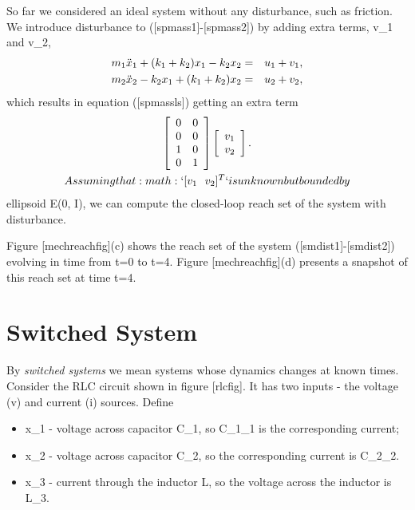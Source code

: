 \documentclass[letterpaper,10pt,english]{sphinxmanual}
\begin{document}
So far we considered an ideal system without any disturbance, such as
friction. We introduce disturbance to ({[}spmass1{]}-{[}spmass2{]}) by adding
extra terms, v_1 and v_2,
\begin{gather}
\begin{split}\begin{aligned}
m_1\ddot{x}_1+(k_1+k_2)x_1-k_2x_2 & = & u_1 + v_1, \label{smdist1}\\
m_2\ddot{x}_2-k_2x_1+(k_1+k_2)x_2 & = & u_2 + v_2, \label{smdist2}\end{aligned}\end{split}\notag
\end{gather}
which results in equation ({[}spmassls{]}) getting an extra term
\begin{gather}
\begin{split}  \left[\begin{array}{cc}
  0 & 0\\
  0 & 0\\
  1 & 0\\
  0 & 1\end{array}\right]\left[\begin{array}{c}
  v_1\\
  v_2\end{array}\right].\end{split}\notag\\\begin{split}Assuming that :math:`[v_1 ~~ v_2]^T` is unknown but bounded by\end{split}\notag
\end{gather}
ellipsoid {\mathcal E}(0, I), we can compute the
closed-loop reach set of the system with disturbance.

Figure {[}mechreachfig{]}(c) shows the reach set of the system
({[}smdist1{]}-{[}smdist2{]}) evolving in time from t=0 to t=4.
Figure {[}mechreachfig{]}(d) presents a snapshot of this reach set at time
t=4.


\section{Switched System}
\label{chap_examples:switched-system}
By \emph{switched systems} we mean systems whose dynamics changes at known
times. Consider the RLC circuit shown in figure {[}rlcfig{]}. It has two
inputs - the voltage (v) and current (i) sources. Define
\begin{itemize}
\item {} 
x_1 - voltage across capacitor C_1, so
C_1_1 is the corresponding current;

\item {} 
x_2 - voltage across capacitor C_2, so the
corresponding current is C_2_2.

\item {} 
x_3 - current through the inductor L, so the voltage
across the inductor is L_3.

\end{itemize}
\end{document}
